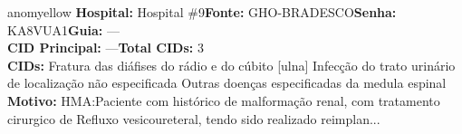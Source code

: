 \documentclass[a4paper,10pt]{article}
\begin{document}
\begin{anomalycard}[Interna\c{c}\~{a}o \#121054 | Pac. \#100327 | MODERADO (z=2.38) | LOS: 12d | 11/03/2026\,$\to$\,—]{anomyellow}
\textbf{Hospital:} Hospital \#9\quad \textbf{Fonte:} GHO-BRADESCO\quad \textbf{Senha:} KA8VUA1\quad \textbf{Guia:} ---\\

\textbf{CID Principal:} {\small ---}\quad\textbf{Total CIDs:} 3\\

\textbf{CIDs:} {\scriptsize Fratura das diáfises do rádio e do cúbito [ulna] \textbar{} Infecção do trato urinário de localização não especificada \textbar{} Outras doenças especificadas da medula espinal}\\

\textbf{Motivo:} {\scriptsize HMA:Paciente com histórico de malformação renal, com tratamento cirurgico de Refluxo vesicoureteral, tendo sido realizado reimplan...}\\




\end{anomalycard}
\end{document}

